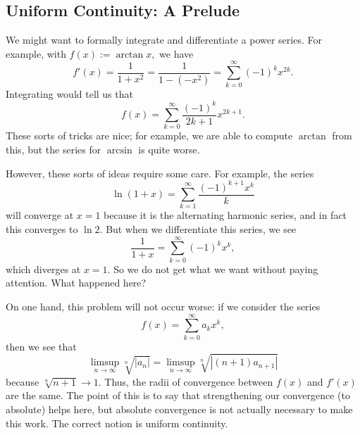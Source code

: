 \subsection{Uniform Continuity: A Prelude}
We might want to formally integrate and differentiate a power series. For example, with $f(x):=\arctan x,$ we have
\[f'(x)=\frac1{1+x^2}=\frac1{1-\left(-x^2\right)}=\sum_{k=0}^\infty(-1)^kx^{2k}.\]
Integrating would tell us that
\[f(x)=\sum_{k=0}^\infty\frac{(-1)^k}{2k+1}x^{2k+1}.\]
These sorts of tricks are nice; for example, we are able to compute $\arctan$ from this, but the series for $\arcsin$ is quite worse.

However, these sorts of ideas require some care. For example, the series
\[\ln(1+x)=\sum_{k=1}^\infty\frac{(-1)^{k+1}x^k}k\]
will converge at $x=1$ because it is the alternating harmonic series, and in fact this converges to $\ln2.$ But when we differentiate this series, we see
\[\frac1{1+x}=\sum_{k=0}^\infty(-1)^kx^k,\]
which diverges at $x=1.$ So we do not get what we want without paying attention. What happened here?

On one hand, this problem will not occur worse: if we consider the series
\[f(x)=\sum_{k=0}^\infty a_kx^k,\]
then we see that
\[\limsup_{n\to\infty}\sqrt[n]{|a_n|}=\limsup_{n\to\infty}\sqrt[n]{|(n+1)a_{n+1}|}\]
because $\sqrt[n]{n+1}\to1.$ Thus, the radii of convergence between $f(x)$ and $f'(x)$ are the same. The point of this is to say that strengthening our convergence (to absolute) helps here, but absolute convergence is not actually necessary to make this work. The correct notion is uniform continuity.

